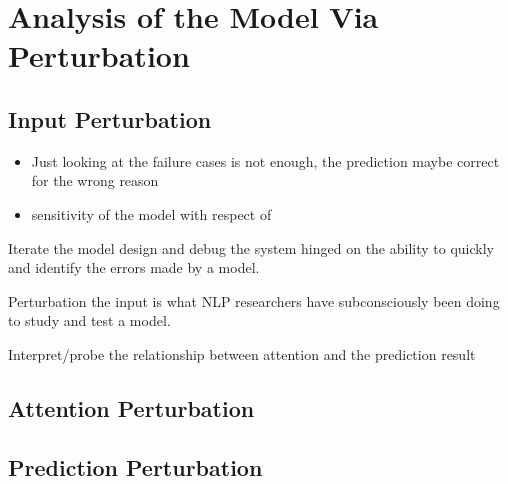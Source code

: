 \section{Analysis of the Model Via Perturbation}


\subsection{Input Perturbation}
\begin{itemize}
    \item Just looking at the failure cases is not enough, the prediction maybe correct for the wrong reason
    \item sensitivity of the model with respect of
\end{itemize}


Iterate the model design and debug the system hinged on the ability to quickly and identify the errors made by a model.

Perturbation the input is what NLP researchers have subconsciously been doing to study and test a model.

Interpret/probe the relationship between attention and the prediction result


\subsection{Attention Perturbation}


\subsection{Prediction Perturbation}
